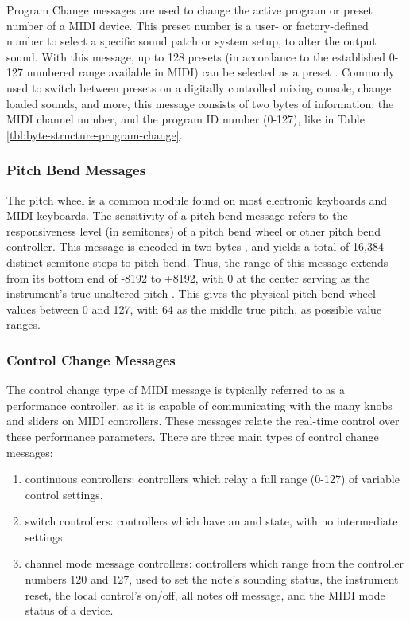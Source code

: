 Program Change messages are used to change the active program or preset number of a MIDI device. This preset number is a user- or factory-defined number to select a specific sound patch or system setup, to alter the output sound. With this message, up to 128 presets (in accordance to the established 0-127 numbered range available in MIDI) can be selected as a preset \cite{Huber_2012}. Commonly used to switch between presets on a digitally controlled mixing console, change loaded sounds, and more, this message consists of two bytes of information: the MIDI channel number, and the program ID number (0-127), like in Table \ref{tbl:byte-structure-program-change}.


\subsubsection{Pitch Bend Messages}

The pitch wheel is a common module found on most electronic keyboards and MIDI keyboards. The sensitivity of a pitch bend message refers to the responsiveness level (in semitones) of a pitch bend wheel or other pitch bend controller. This message is encoded in two bytes \cite{McGuire_2014}, and yields a total of 16,384 distinct semitone steps to pitch bend. Thus, the range of this message extends from its bottom end of -8192 to +8192, with 0 at the center serving as the instrument's true unaltered pitch \cite{Huber_2012}. This gives the physical pitch bend wheel values between 0 and 127, with 64 as the middle true pitch, as possible value ranges.

\subsubsection{Control Change Messages}

The control change type of MIDI message is typically referred to as a performance controller, as it is capable of communicating with the many knobs and sliders on MIDI controllers. These messages relate the real-time control over these performance parameters. There are three main types of control change messages:

\begin{enumerate}
	\item continuous controllers: controllers which relay a full range (0-127) of variable control settings.
	\item switch controllers: controllers which have an  and  state, with no intermediate settings.
	\item channel mode message controllers: controllers which range from the controller numbers 120 and 127, used to set the note's sounding status, the instrument reset, the local control's on/off, all notes off message, and the MIDI mode status of a device.
\end{enumerate}

